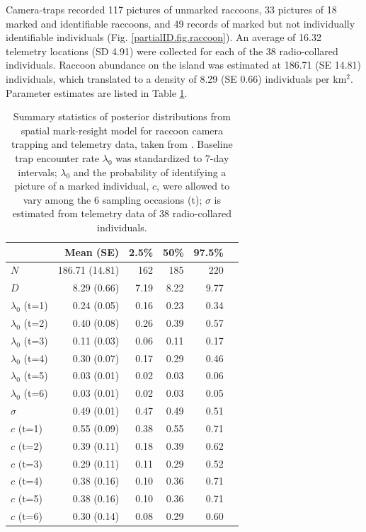 Camera-traps recorded 117 pictures of unmarked raccoons, 33 pictures
of 18 marked and identifiable raccoons, and 49 records of marked but
not individually identifiable individuals
(Fig. \ref{partialID.fig.raccoon}). An average of 16.32 telemetry
locations (SD 4.91) were collected for each of the 38 radio-collared
individuals. Raccoon abundance on the island was estimated at 186.71
(SE 14.81) individuals, which translated to a density of 8.29 (SE
0.66) individuals per km$^2$. Parameter estimates are listed in
Table \ref{partialID.tab.raccoons}.

\begin{table}%
\centering
\caption{Summary statistics of posterior distributions
  from spatial mark-resight model for raccoon camera trapping and telemetry data, taken from \citep{sollmann_etal:2012ecol}. Baseline trap encounter rate $\lambda_0$ was standardized to 7-day intervals; $\lambda_0$ and the probability of identifying a picture of a marked individual, $c$, were allowed to vary among the 6 sampling occasions (t); $\sigma$ is estimated from telemetry data of 38 radio-collared individuals.}
\begin{tabular}{lrrrrr}
\hline
   &	Mean (SE) &	2.5\% &	50\%	& 97.5\% \\
 \hline
$N$	& 186.71 (14.81) & 162 & 185	& 220 \\
$D$	& 8.29 (0.66)	& 7.19	& 8.22	& 9.77 \\
$\lambda_0$ (t=1)	& 0.24 (0.05) & 0.16 & 0.23 & 0.34 \\
$\lambda_0$ (t=2)	& 0.40 (0.08)	& 0.26	& 0.39	& 0.57 \\
$\lambda_0$ (t=3)	& 0.11 (0.03) & 0.06 & 0.11	& 0.17 \\
$\lambda_0$ (t=4)	& 0.30 (0.07)	& 0.17	& 0.29	& 0.46 \\
$\lambda_0$ (t=5)	& 0.03 (0.01)	& 0.02	& 0.03	& 0.06 \\
$\lambda_0$ (t=6)	& 0.03 (0.01)	& 0.02	& 0.03	& 0.05 \\
$\sigma$	& 0.49 (0.01)	& 0.47	& 0.49	& 0.51 \\
$c$ (t=1)	& 0.55 (0.09)	& 0.38	& 0.55	& 0.71 \\
$c$ (t=2)	& 0.39 (0.11)	& 0.18	& 0.39	& 0.62 \\
$c$ (t=3)	& 0.29 (0.11) & 0.11	& 0.29	& 0.52 \\
$c$ (t=4)	& 0.38 (0.16)	& 0.10	& 0.36	& 0.71 \\
$c$ (t=5)	& 0.38 (0.16)	& 0.10	& 0.36	& 0.71 \\
$c$ (t=6)	& 0.30 (0.14)	& 0.08	& 0.29	& 0.60 \\
 \hline
\end{tabular}
\label{partialID.tab.raccoons}
\end{table}


